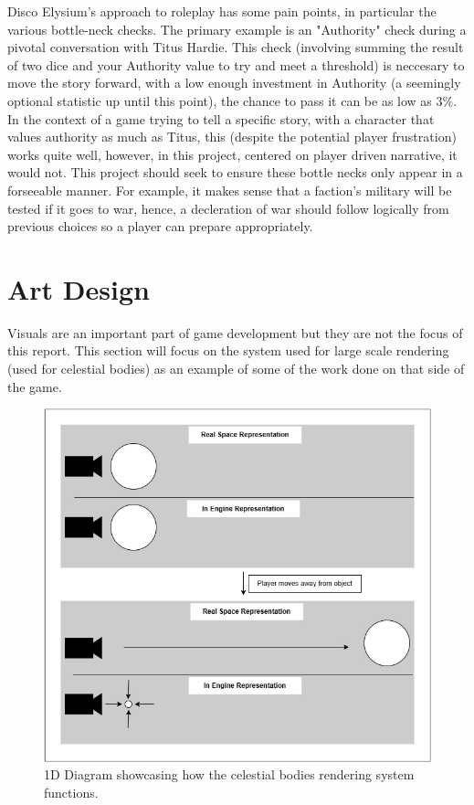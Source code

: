 \documentclass{report}
\begin{document}
Disco Elysium's approach to roleplay has some pain points, in particular the various bottle-neck checks. The primary example is an "Authority" check during a pivotal conversation with Titus Hardie. This check (involving summing the result of two dice and your Authority value to try and meet a threshold) is neccesary to move the story forward, with a low enough investment in Authority (a seemingly optional statistic up until this point), the chance to pass it can be as low as 3\%. In the context of a game trying to tell a specific story, with a character that values authority as much as Titus, this (despite the potential player frustration) works quite well, however, in this project, centered on player driven narrative, it would not. This project should seek to ensure these bottle necks only appear in a forseeable manner. For example, it makes sense that a faction's military will be tested if it goes to war, hence, a decleration of war should follow logically from previous choices so a player can prepare appropriately.

\section{Art Design}

Visuals are an important part of game development but they are not the focus of this report. This section will focus on the system used for large scale rendering (used for celestial bodies) as an example of some of the work done on that side of the game. 

\begin{figure}[H]
    \includegraphics[width=\textwidth]{celestialbodiesSystemDiagram.jpg}
    \caption{1D Diagram showcasing how the celestial bodies rendering system functions.}
\end{figure}
\end{document}
